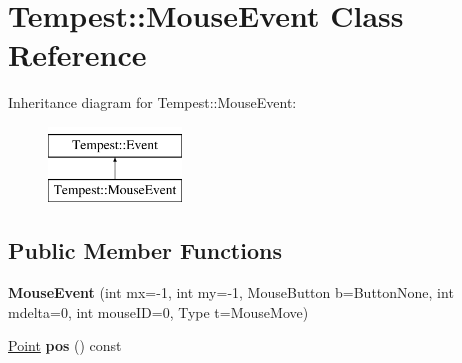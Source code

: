 \hypertarget{class_tempest_1_1_mouse_event}{\section{Tempest\+:\+:Mouse\+Event Class Reference}
\label{class_tempest_1_1_mouse_event}
}
Inheritance diagram for Tempest\+:\+:Mouse\+Event\+:\begin{figure}[H]
\begin{center}
\leavevmode
\includegraphics[height=2.000000cm]{class_tempest_1_1_mouse_event}
\end{center}
\end{figure}
\subsection*{Public Member Functions}
\begin{DoxyCompactItemize}
\item 
\hypertarget{class_tempest_1_1_mouse_event_a61783f8a11fd73170bda9a2b2cf3665f}{{\bfseries Mouse\+Event} (int mx=-\/1, int my=-\/1, Mouse\+Button b=Button\+None, int mdelta=0, int mouse\+I\+D=0, Type t=Mouse\+Move)}\label{class_tempest_1_1_mouse_event_a61783f8a11fd73170bda9a2b2cf3665f}

\item 
\hypertarget{class_tempest_1_1_mouse_event_a3a4b8f92923d95beb904bcdb4f15276d}{\hyperlink{struct_tempest_1_1_point}{Point} {\bfseries pos} () const }\label{class_tempest_1_1_mouse_event_a3a4b8f92923d95beb904bcdb4f15276d}

\end{DoxyCompactItemize}
